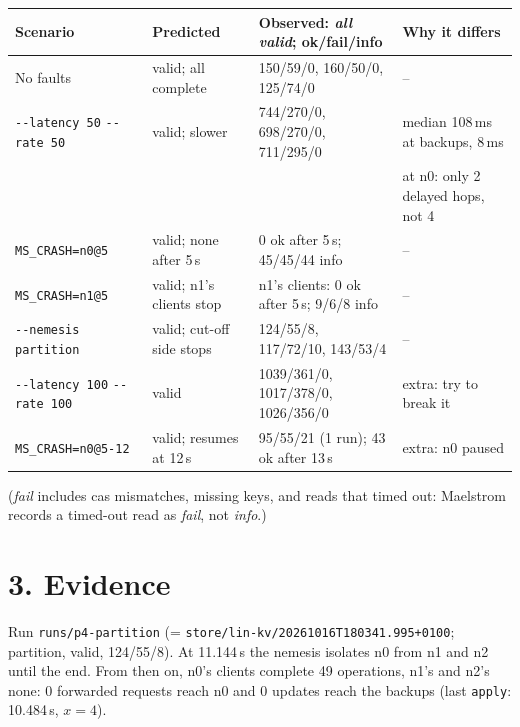 \documentclass[a4paper,10pt]{article}
\newcommand{\opt}[1]{\texttt{-{}-#1}}
\begin{document}
\begin{center}
\footnotesize
\begin{tabular}{@{}llll@{}}
\toprule
Scenario & Predicted & Observed: \emph{all valid}; ok/fail/info & Why it differs \\
\midrule
No faults & valid; all complete & 150/59/0, 160/50/0, 125/74/0 & -- \\
\opt{latency 50} \opt{rate 50} & valid; slower & 744/270/0, 698/270/0, 711/295/0 & median 108\,ms at backups, 8\,ms \\
 & & & at n0: only 2 delayed hops, not 4\\
\texttt{MS\_CRASH=n0@5} & valid; none after 5\,s & 0 ok after 5\,s; 45/45/44 info & -- \\
\texttt{MS\_CRASH=n1@5} & valid; n1's clients stop & n1's clients: 0 ok after 5\,s; 9/6/8 info & -- \\
\opt{nemesis partition} & valid; cut-off side stops & 124/55/8, 117/72/10, 143/53/4 & -- \\
\midrule
\opt{latency 100} \opt{rate 100} & valid & 1039/361/0, 1017/378/0, 1026/356/0 & extra: try to break it \\
\texttt{MS\_CRASH=n0@5-12} & valid; resumes at 12\,s & 95/55/21 (1 run); 43 ok after 13\,s & extra: n0 paused \\
\bottomrule
\end{tabular}
\end{center}
\vspace{-0.5em}
\noindent (\emph{fail} includes cas mismatches, missing keys, and reads that
timed out: Maelstrom records a timed-out read as \emph{fail}, not
\emph{info}.)

\section*{3. Evidence}

Run \texttt{runs/p4-partition} (= \texttt{store/lin-kv/20261016T180341.995+0100};
partition, valid, 124/55/8). At 11.144\,s the nemesis isolates n0 from n1 and n2 until the
end. From then on, n0's clients complete 49 operations, n1's and n2's
none: 0 forwarded requests reach n0 and 0 updates reach the backups (last
\texttt{apply}: 10.484\,s, $x=4$).
\end{document}
